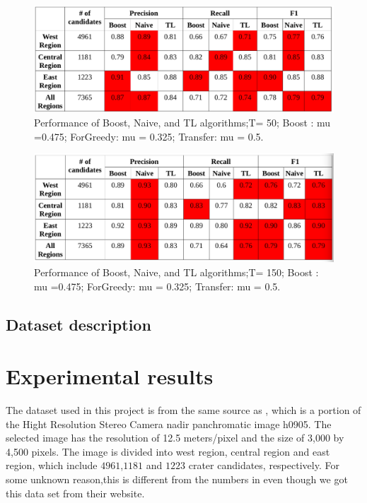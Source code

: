 \documentclass[conference]{IEEEtran}
\begin{document}
\begin{figure}[ht]
\begin{center}
\includegraphics[scale=0.45]{T_50.png}
\caption{Performance of Boost, Naive, and TL algorithms;T= 50; Boost : mu =0.475; ForGreedy: mu = 0.325; Transfer: mu = 0.5.}
\label{T50}
\end{center}
\end{figure}

\begin{figure}[ht]
\begin{center}
\includegraphics[scale=0.45]{T_150.png}
\caption{Performance of Boost, Naive, and TL algorithms;T= 150; Boost : mu =0.475; ForGreedy: mu = 0.325; Transfer: mu = 0.5.}
\label{T150}
\end{center}
\end{figure}
\subsection{Dataset description}
\section{Experimental results}

The dataset used in this project is from the same source as \cite{ding2011subkilometer}, which is a portion of the Hight Resolution Stereo Camera nadir panchromatic image h0905. The selected image has the resolution of 12.5 meters/pixel and the size of 3,000 by 4,500 pixels. The image is divided into west region, central region and east region, which include $4961$,$1181$ and $1223$ crater candidates, respectively. For some unknown reason,this is different from the numbers in \cite{ding2011subkilometer} even though we got this data set from their website.
\end{document}
